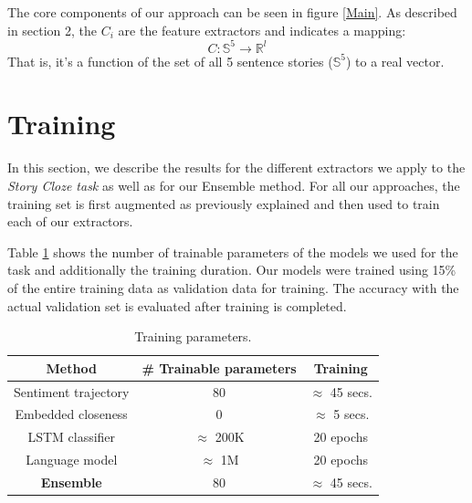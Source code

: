\documentclass{article}
\begin{document}
The core components of our approach can be seen in figure \ref*{Main}. As described in section 2, the $C_i$ are the feature extractors and indicates a mapping:
\begin{equation}
C: \mathbb{S}^5 \rightarrow \mathbb{R}^l
\end{equation}
That is, it's a function of the set of all 5 sentence stories ($\mathbb{S}^5$) to a real vector. 


\section{Training}
\label{sec:training}

In this section, we describe the results for the different extractors we apply
to the {\it Story Cloze task} as well as for our Ensemble method. For all our
approaches, the training set is first augmented as previously explained and then
used to train each of our extractors.

Table \ref{tab:params} shows the number of trainable parameters of the models we
used for the task and additionally the training duration. Our models were
trained using 15\% of the entire training data as validation data for training.
The accuracy with the actual validation set is evaluated after training is
completed. 

\begin{table}
    \caption{Training parameters.}
    \begin{center}
        \label{tab:params}
        \begin{tabular}{||c c c||} 
            \hline
            Method                 & \# Trainable parameters   & Training \\ [0.5ex] 
            \hline\hline
            Sentiment trajectory   & 80                        & $ \approx $ 45 secs. \\ 
            \hline
            Embedded closeness     & 0                         & $ \approx $ 5 secs.  \\
            \hline
            LSTM classifier        & $ \approx $ 200K          & 20 epochs \\ %
            \hline
            Language model         & $ \approx $ 1M            & 20 epochs \\ %
            \hline
            \textbf{Ensemble}      & 80                        & $ \approx $ 45 secs.  \\ [1ex] 
            \hline
        \end{tabular}
    \end{center}
\end{table}
\end{document}
